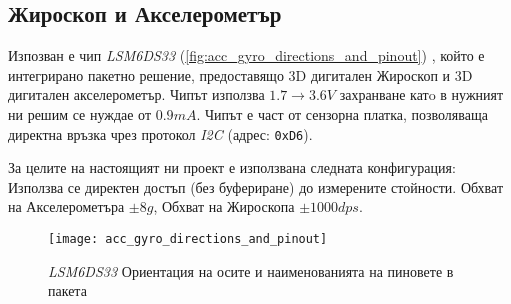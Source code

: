 \subsection{Жироскоп и Акселерометър}
\FloatBarrier

Изпозван е чип \textit{LSM6DS33} (\autoref{fig:acc_gyro_directions_and_pinout}) \cite{accgyrorefman},
който е интегрирано пакетно решение, 
предоставящо 3D дигитален Жироскоп и 3D дигитален акселерометър.
Чипът използва \(1.7 \to 3.6V\) захранване катo в нужният ни решим се нуждае от \(0.9mA\).
Чипът е част от сензорна платка, позволяваща директна връзка чрез протокол \textit{I2C} (адрес: \texttt{0xD6}).


За целите на настоящият ни проект е използвана следната конфигурация:
Използва се директен достъп (без буфериране) до измерените стойности.
Обхват на Акселерометъра \(\pm 8g\), Обхват на Жироскопа \(\pm 1000 dps\).


\begin{figure}[htpb!]
    \centering
    \texttt{[image: acc\_gyro\_directions\_and\_pinout]}
    \caption{\textit{LSM6DS33} Ориентация на осите и наименованията на пиновете в пакета}
    \label{fig:acc_gyro_directions_and_pinout}
\end{figure}

\FloatBarrier